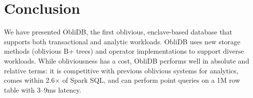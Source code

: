 \documentclass[letterpaper,twocolumn,10pt]{article}
\def\name/{ObliDB}
\begin{document}
\section{Conclusion}\label{conclusion}
We have presented \name/, the first oblivious, enclave-based database that supports both transactional and analytic workloads. \name/ uses new storage methods (oblivious B+ trees) and operator implementations to support diverse workloads. While obliviousness has a cost, \name/ performs well in absolute and relative terms: it is competitive with previous oblivious systems for analytics, comes within 2.6$\times$ of Spark SQL, and can perform point queries on a 1M row table with 3--9ms latency.


{\small 
}


\end{document}
